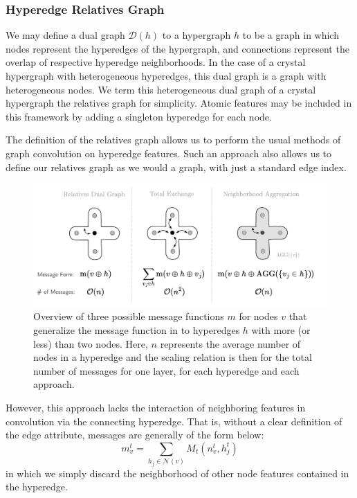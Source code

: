 \documentclass[twoside,twocolumn,9pt]{article}
\begin{document}
\subsubsection{Hyperedge Relatives Graph}
We may define a dual graph $\mathcal{D}(h)$ to a hypergraph $h$ to be a graph in which nodes represent the hyperedges of the hypergraph, and connections represent the overlap of respective hyperedge neighborhoods. 
In the case of a crystal hypergraph with heterogeneous hyperedges, this dual graph is a graph with heterogeneous nodes. We term this heterogeneous dual graph of a crystal hypergraph the relatives graph for simplicity. Atomic features may be included in this framework by adding a singleton hyperedge for each node.

The definition of the relatives graph allows us to perform the usual methods of graph convolution on hyperedge features. Such an approach also allows us to define our relatives graph as we would a graph, with just a standard edge index.

\begin{figure}
	\centering
	\includegraphics[scale=.81]{HMPNN.pdf}
	\caption{Overview of three possible message functions $m$ for nodes $v$ that generalize the message function in \cite{mpnn} to hyperedges $h$ with more (or less) than two nodes. Here, $n$ represents the average number of nodes in a hyperedge and the scaling relation is then for the total number of messages for one layer, for each hyperedge and each approach.}
	\label{fig:hmpnn}
\end{figure}

However, this approach lacks the interaction of neighboring features in convolution via the connecting hyperedge. That is, without a clear definition of the edge attribute, messages are generally of the form below:
$$
m_v^{t} = \sum_{h_j\in \mathcal{N}(v)}M_t(n_v^{t},h_j^{t})
$$
in which we simply discard the neighborhood of other node features contained in the hyperedge.
\end{document}

